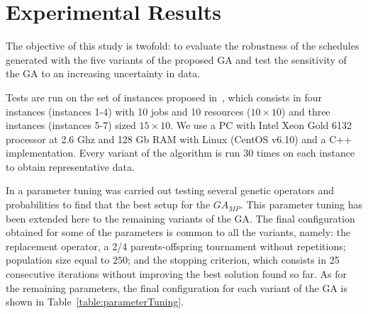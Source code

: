 \documentclass[12pt,halfline,a4paper]{ouparticle}
\begin{document}
\section{Experimental Results}\label{secResults}
The objective of this study is twofold:  to evaluate the robustness of the schedules generated with the five variants of the proposed GA and test the sensitivity of the GA to an increasing uncertainty in data.


Tests are run on the set of instances proposed in~\cite{Lei2012c}, which consists in four instances (instances 1-4) with 10 jobs and 10 resources ($10 \times 10$) and three instances (instances 5-7) sized $15 \times 10$. We use a PC with Intel Xeon Gold 6132 processor at 2.6 Ghz and 128 Gb RAM with Linux (CentOS v6.10) and a C++ implementation. Every variant of the algorithm is run 30 times on each instance to obtain representative data.

In \cite{Diaz2020} a parameter tuning was carried out testing several genetic operators and probabilities to find  that the best setup for the $GA_{MP}$. This parameter tuning has been extended here to the remaining variants of the GA. The final configuration obtained for  some of the parameters is common to all the variants, namely: the replacement operator, a 2/4 parents-offspring tournament without repetitions; population size equal to $250$; and the stopping criterion, which consists in 25 consecutive iterations without improving the best solution found so far. As for the remaining parameters, the final configuration for each variant of the GA is shown in Table~\ref{table:parameterTuning}. 

\begin{table}[htb]
\small
\centering
\caption{\label{table:parameterTuning} Final parameter setup for each variant of the GA}
\end{table}
\end{document}
